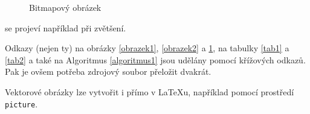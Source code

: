 \documentclass[a4paper, 11pt]{article}
\begin{document}
\begin{figure}[h]
    \centering
    \caption{Bitmapový obrázek}
    \label{obrazek3}
\end{figure}
se projeví například při zvětšení.

Odkazy (nejen ty) na obrázky \ref{obrazek1}, \ref{obrazek2} a \ref{obrazek3}, na
tabulky \ref{tab1} a \ref{tab2} a také na Algoritmus \ref{algoritmus1} jsou udělány pomocí
křížových odkazů. Pak je ovšem potřeba zdrojový soubor přeložit dvakrát.

Vektorové obrázky lze vytvořit i přímo v \LaTeX u, například pomocí prostředí
\texttt{ picture}.
\end{document}
